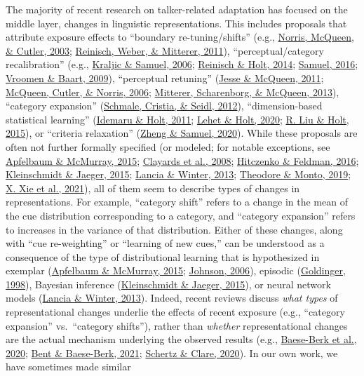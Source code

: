 \documentclass[
  11pt,
  english,
  man,floatsintext]{apa6}
\begin{document}
The majority of recent research on talker-related adaptation has focused on the middle layer, changes in linguistic representations. This includes proposals that attribute exposure effects to ``boundary re-tuning/shifts'' (e.g., \protect\hyperlink{ref-norris2003}{Norris, McQueen, \& Cutler, 2003}; \protect\hyperlink{ref-reinisch2011}{Reinisch, Weber, \& Mitterer, 2011}), ``perceptual/category recalibration'' (e.g., \protect\hyperlink{ref-kraljic-samuel2006}{Kraljic \& Samuel, 2006}; \protect\hyperlink{ref-reinisch-holt2014}{Reinisch \& Holt, 2014}; \protect\hyperlink{ref-samuel2016}{Samuel, 2016}; \protect\hyperlink{ref-vroomen-baart2009}{Vroomen \& Baart, 2009}), ``perceptual retuning'' (\protect\hyperlink{ref-jesse-mcqueen2011}{Jesse \& McQueen, 2011}; \protect\hyperlink{ref-mcqueen2006}{McQueen, Cutler, \& Norris, 2006}; \protect\hyperlink{ref-mitterer2013}{Mitterer, Scharenborg, \& McQueen, 2013}), ``category expansion'' (\protect\hyperlink{ref-schmale2012}{Schmale, Cristia, \& Seidl, 2012}), ``dimension-based statistical learning'' (\protect\hyperlink{ref-idemaru-holt2011}{Idemaru \& Holt, 2011}; \protect\hyperlink{ref-lehet-holt2020}{Lehet \& Holt, 2020}; \protect\hyperlink{ref-liu-holt2015}{R. Liu \& Holt, 2015}), or ``criteria relaxation'' (\protect\hyperlink{ref-zheng-samuel2020}{Zheng \& Samuel, 2020}). While these proposals are often not further formally specified (or modeled; for notable exceptions, see \protect\hyperlink{ref-apfelbaum-mcmurray2015}{Apfelbaum \& McMurray, 2015}; \protect\hyperlink{ref-clayards2008}{Clayards et al., 2008}; \protect\hyperlink{ref-hitczenko-feldman2016}{Hitczenko \& Feldman, 2016}; \protect\hyperlink{ref-kleinschmidt-jaeger2015}{Kleinschmidt \& Jaeger, 2015}; \protect\hyperlink{ref-lancia-winter2013}{Lancia \& Winter, 2013}; \protect\hyperlink{ref-theodore-monto2019}{Theodore \& Monto, 2019}; \protect\hyperlink{ref-xie2021cognition}{X. Xie et al., 2021}), all of them seem to describe types of changes in representations. For example, ``category shift'' refers to a change in the mean of the cue distribution corresponding to a category, and ``category expansion'' refers to increases in the variance of that distribution. Either of these changes, along with ``cue re-weighting'' or ``learning of new cues,'' can be understood as a consequence of the type of distributional learning that is hypothesized in exemplar (\protect\hyperlink{ref-apfelbaum-mcmurray2015}{Apfelbaum \& McMurray, 2015}; \protect\hyperlink{ref-johnson2006}{Johnson, 2006}), episodic (\protect\hyperlink{ref-goldinger1998}{Goldinger, 1998}), Bayesian inference (\protect\hyperlink{ref-kleinschmidt-jaeger2015}{Kleinschmidt \& Jaeger, 2015}), or neural network models (\protect\hyperlink{ref-lancia-winter2013}{Lancia \& Winter, 2013}). Indeed, recent reviews discuss \emph{what types} of representational changes underlie the effects of recent exposure (e.g., ``category expansion'' vs.~``category shifts''), rather than \emph{whether} representational changes are the actual mechanism underlying the observed results (e.g., \protect\hyperlink{ref-baeseberk2020}{Baese-Berk et al., 2020}; \protect\hyperlink{ref-bent-baeseberk2021}{Bent \& Baese-Berk, 2021}; \protect\hyperlink{ref-schertz-clare2020}{Schertz \& Clare, 2020}). In our own work, we have sometimes made similar 
\end{document}
